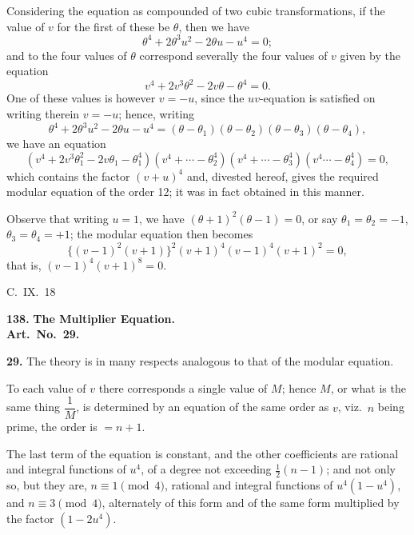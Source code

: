 \documentclass[11pt,a4paper]{article}
\theoremstyle{plain}
\begin{document}
Considering the equation as compounded of two cubic transformations, if the value of $v$ for the first of these be $\theta$, then we have
\[
\theta^4 + 2\theta^3u^2 - 2\theta u - u^4 = 0;
\]
and to the four values of $\theta$ correspond severally the four values of $v$ given by the equation
\[
v^4 + 2v^3\theta^2 - 2v\theta - \theta^4 = 0.
\]
One of these values is however $v = -u$, since the $uv$-equation is satisfied on writing therein $v = -u$; hence, writing
\[
\theta^4 + 2\theta^3u^2 - 2\theta u - u^4 = (\theta - \theta_1)(\theta - \theta_2)(\theta - \theta_3)(\theta - \theta_4),
\]
we have an equation
\[
(v^4 + 2v^3\theta_1^2 - 2v\theta_1 - \theta_1^4)(v^4 + \cdots - \theta_2^4)(v^4 + \cdots - \theta_3^4)(v^4 \cdots - \theta_4^4) = 0,
\]
which contains the factor $(v + u)^4$ and, divested hereof, gives the required modular equation of the order 12; it was in fact obtained in this manner.

Observe that writing $u = 1$, we have $(\theta + 1)^2(\theta - 1) = 0$, or say $\theta_1 = \theta_2 = -1$, $\theta_3 = \theta_4 = +1$; the modular equation then becomes
\[
\{(v - 1)^2(v + 1)\}^2(v + 1)^4(v - 1)^4(v + 1)^2 = 0,
\]
that is, $(v - 1)^4(v + 1)^8 = 0$.

\begin{flushright}
C.~IX.~18
\end{flushright}


\noindent\textbf{138.} \textbf{The Multiplier Equation.}\\
\textbf{Art.~No.~29.}

\medskip
\noindent\textbf{29.} The theory is in many respects analogous to that of the modular equation.

To each value of $v$ there corresponds a single value of $M$; hence $M$, or what is the same thing $\dfrac{1}{M}$, is determined by an equation of the same order as $v$, viz.\ $n$ being prime, the order is $= n + 1$.

The last term of the equation is constant, and the other coefficients are rational and integral functions of $u^4$, of a degree not exceeding $\frac{1}{2}(n - 1)$; and not only so, but they are, $n \equiv 1 \pmod{4}$, rational and integral functions of $u^4(1 - u^4)$, and $n \equiv 3 \pmod{4}$, alternately of this form and of the same form multiplied by the factor $(1 - 2u^4)$.
\end{document}
